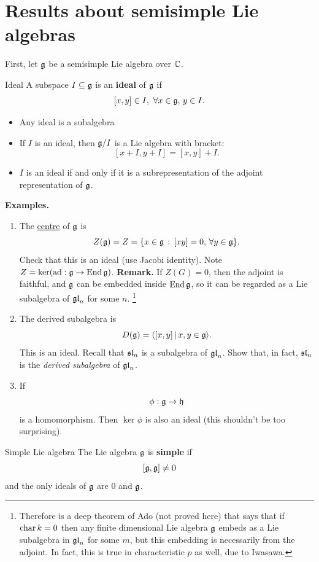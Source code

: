 \documentclass{article}
\begin{document}
\section{Results about semisimple Lie algebras}
First, let $\mathfrak{g}$ be a semisimple Lie algebra over $\mathbb{C}$.
\begin{fancydefine}{Ideal}
    A subspace $I \subseteq \mathfrak{g}$ is an \textbf{ideal} of $\mathfrak{g}$ if \[ [x,y] \in I, \, \, \forall x \in \mathfrak{g},\, y\in I.\]
    \begin{itemize}
        \item Any ideal is a subalgebra
        \item If $I$ is an ideal, then $\mathfrak{g}/I$ is a Lie algebra with bracket: \[ [x+I,y+I]=[x,y]+I.\] 
        \item $I$ is an ideal if and only if it is a subrepresentation of the adjoint representation of $\mathfrak{g}$.
    \end{itemize}
\end{fancydefine}
\textbf{Examples. } \hspace{0.1cm}
    \begin{enumerate}
        \item[(1)] The \underline{centre} of $\mathfrak{g}$ is \[ Z(\mathfrak{g}) = Z = \{ x \in \mathfrak{g} \, : \, [xy] = 0, \, \forall y \in \mathfrak{g} \}.\] Check that this is an ideal (use Jacobi identity). Note $Z = \ker( \operatorname{ad} : \mathfrak{g} \to \operatorname{End} \mathfrak{g})$.\gap
         \textbf{Remark. } If $Z(G)=0$, then the adjoint is faithful, and $\mathfrak{g}$ can be embedded inside $\operatorname{End} \mathfrak{g}$, so it can be regarded as a Lie subalgebra of $\mathfrak{gl}_{n}$ for some $n$.
         \footnote{Therefore is a deep theorem of Ado (not proved here) that says that if $\operatorname{char} k =0$ then any finite dimensional Lie algebra $\mathfrak{g}$ embeds as a Lie subalgebra in $\mathfrak{gl}_{n}$ for some $m$, but this embedding is necessarily from the adjoint. In fact, this is true in characteristic $p$ as well, due to Iwasawa.}
        \item[(2)] The derived subalgebra is \[ D(\mathfrak{g}) =\langle [x,y] \, | \, x,y \in \mathfrak{g} \rangle.\] This is an ideal. Recall that $\mathfrak{sl}_{n}$ is a subalgebra of $\mathfrak{gl}_{n}$. Show that, in fact, $\mathfrak{sl}_{n}$ is the \textit{derived subalgebra} of $\mathfrak{gl}_{n}$.
        \item[(3)] If \[ \phi : \mathfrak{g} \to \mathfrak{h}\] is a homomorphism. Then $\ker \phi$ is also an ideal (this shouldn't be too surprising).
    \end{enumerate}
\newlec
\begin{fancydefine}{Simple Lie algebra}
    The Lie algebra $\mathfrak{g}$ is \textbf{simple} if \[ [\mathfrak{g}, \mathfrak{g}] \neq 0 \] and the only ideals of $\mathfrak{g}$ are $0$ and $\mathfrak{g}$.
\end{fancydefine}
\end{document}
